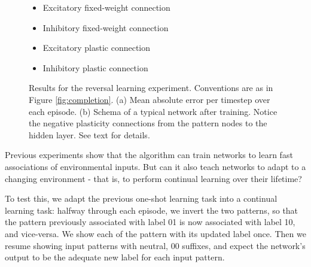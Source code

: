 \documentclass{article}
\begin{document}
\begin{figure}
\begin{subfigure}[t]{0.4\textwidth}
\end{subfigure}
\begin{minipage}[b]{0.2\textwidth}
\noindent
\small
\begin{itemize}[leftmargin=*] %
\item[]\tikz{\path[very thick,->,draw=black] %
        (0,0) -- (1,0) ;}Excitatory fixed-weight connection
\item[]\tikz{\path[very thick,->,draw=blue] %
        (0,0) -- (1,0) ;}Inhibitory fixed-weight connection
\item[]\tikz{\path[very thick,->,dashed,draw=black] %
        (0,0) -- (1,0) ;}Excitatory plastic connection
\item[]\tikz{\path[very thick,->,dashed,draw=blue] %
        (0,0) -- (1,0) ;}Inhibitory plastic connection
\end{itemize}
\end{minipage}

\caption{Results for the reversal learning experiment. Conventions are as in Figure
    \ref{fig:completion}.
(a) Mean absolute error
    per timestep over each episode. (b) Schema of a
typical network after training. Notice the negative plasticity connections from
the pattern nodes to the hidden layer. See text for details.}
\label{fig:reversal}
\end{figure}



Previous experiments show that the algorithm can train networks to learn fast
associations of environmental inputs. But can it also teach networks to adapt to
a changing environment - that is, to perform continual learning over their
lifetime? 

To test this, we adapt the previous one-shot learning task into a
continual learning task: halfway through each episode, we invert the two
patterns, so that the pattern previously associated with label 01 is now
associated with label 10, and vice-versa. We show each of the pattern with its
updated label once. Then we resume showing input patterns with neutral, 00
suffixes, and expect the network's output to be the adequate new label for
each input pattern.
\end{document}
